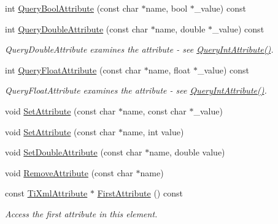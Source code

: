 \begin{DoxyCompactItemize}
int \hyperlink{classTiXmlElement_a5789b1488af75b6ae37a749700495ceb}{Query\+Bool\+Attribute} (const char $\ast$name, bool $\ast$\+\_\+value) const
\item 
\mbox{\label{classTiXmlElement_ae04bad29ddb281a7e6c662b3882e9928}} 
int \hyperlink{classTiXmlElement_ae04bad29ddb281a7e6c662b3882e9928}{Query\+Double\+Attribute} (const char $\ast$name, double $\ast$\+\_\+value) const
\begin{DoxyCompactList}\small\item\em Query\+Double\+Attribute examines the attribute -\/ see \hyperlink{classTiXmlElement_a5c0f739e0f6f5905a201364532e54a60}{Query\+Int\+Attribute()}. \end{DoxyCompactList}\item 
\mbox{\label{classTiXmlElement_a5591929834178699b4561ab6ab460068}} 
int \hyperlink{classTiXmlElement_a5591929834178699b4561ab6ab460068}{Query\+Float\+Attribute} (const char $\ast$name, float $\ast$\+\_\+value) const
\begin{DoxyCompactList}\small\item\em Query\+Float\+Attribute examines the attribute -\/ see \hyperlink{classTiXmlElement_a5c0f739e0f6f5905a201364532e54a60}{Query\+Int\+Attribute()}. \end{DoxyCompactList}\item 
void \hyperlink{classTiXmlElement_abf0b3bd7f0e4c746a89ec6e7f101fc32}{Set\+Attribute} (const char $\ast$name, const char $\ast$\+\_\+value)
\item 
void \hyperlink{classTiXmlElement_ace6f4be75e373726d4774073d666d1a7}{Set\+Attribute} (const char $\ast$name, int value)
\item 
void \hyperlink{classTiXmlElement_a0d1dd975d75496778177e35abfe0ec0b}{Set\+Double\+Attribute} (const char $\ast$name, double value)
\item 
void \hyperlink{classTiXmlElement_a56979767deca794376b1dfa69a525b2a}{Remove\+Attribute} (const char $\ast$name)
\item 
\mbox{\label{classTiXmlElement_a003131b1bbf0b8054b11571c1b9a4d3a}} 
const \hyperlink{classTiXmlAttribute}{Ti\+Xml\+Attribute} $\ast$ \hyperlink{classTiXmlElement_a003131b1bbf0b8054b11571c1b9a4d3a}{First\+Attribute} () const
\begin{DoxyCompactList}\small\item\em Access the first attribute in this element. \end{DoxyCompactList}\item 

\end{DoxyCompactItemize}
